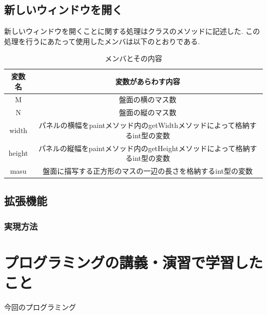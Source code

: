 \documentclass[dvipdfmx]{jarticle}
\begin{document}
\subsection{新しいウィンドウを開く}
新しいウィンドウを開くことに関する処理はクラスのメソッドに記述した.
この処理を行うにあたって使用したメンバは以下のとおりである.
\begin{table}[h]
  \centering
  \begin{tabular}{|c||c|}
    \hline
    変数名 & 変数があらわす内容\\
    \hline\hline
    M & 盤面の横のマス数\\\hline
    N & 盤面の縦のマス数\\\hline
    width & パネルの横幅をpaintメソッド内のgetWidthメソッドによって格納するint型の変数 \\\hline
    height & パネルの縦幅をpaintメソッド内のgetHeightメソッドによって格納するint型の変数\\\hline
    masu & 盤面に描写する正方形のマスの一辺の長さを格納するint型の変数\\\hline

  \end{tabular}
  \caption{メンバとその内容}
\end{table}



\subsection{拡張機能}


\subsubsection{実現方法}


\section{プログラミングの講義・演習で学習したこと}
今回のプログラミング
\end{document}
